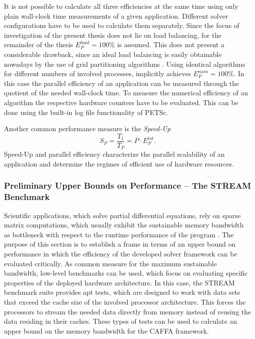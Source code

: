It is not possible to calculate all three efficiencies at the same time using only plain wall-clock time measurements of a given application.  Different solver configurations have to be used to calculate them separately. Since the focus of investigation of the present thesis does not lie on load balancing, for the remainder of the thesis \(E^{load}_P = 100\%  \) is assumed. This does not present a considerable drawback, since an ideal load balancing is easily obtainable nowadays by the use of grid partitioning algorithms \cite{ferziger02}. Using identical algorithms for different numbers of involved processes, implicitly achieves \(E^{num}_P = 100 \%\). In this case the parallel efficiency of an application can be measured through the quotient of the needed wall-clock time. To measure the numerical efficiency of an algorithm the respective hardware counters have to be evaluated. This can be done using the built-in log file functionality of PETSc. 

Another common performance measure is the \emph{Speed-Up}
\begin{displaymath}
  S_P = \frac{T_1}{T_P} = P \cdot E^{tot}_P.
\end{displaymath}
Speed-Up and parallel efficiency characterize the parallel scalability of an application and determine the regimes of efficient use of hardware resources.

\subsubsection{Preliminary Upper Bounds on Performance -- The STREAM Benchmark}

Scientific applications, which solve partial differential equations, rely on sparse matrix computations, which usually exhibit the sustainable memory bandwidth as bottleneck with respect to the runtime performance of the program \cite{hager11}. The purpose of this section is to establish a frame in terms of an upper bound on performance in which the efficiency of the developed solver framework can be evaluated critically. As common measure for the maximum sustainable bandwidth, low-level benchmarks can be used, which focus on evaluating specific properties of the deployed hardware architecture. In this case, the STREAM benchmark suite \cite{mccalpin07,mccalpin95} provides apt tests, which are designed to work with data sets that exceed the cache size of the involved processor architecture. This forces the processors to stream the needed data directly from memory instead of reusing the data residing in their caches. These types of tests can be used to calculate an upper bound on the memory bandwidth for the CAFFA framework.

